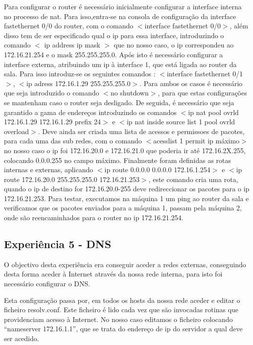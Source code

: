 \documentclass[a4paper]{article}
\begin{document}
Para configurar o router é necessário inicialmente configurar a interface interna no processo de nat. Para isso,entra-se na consola de configuração da interface fastethernet 0/0 do router, com o comando $<$interface fastethernet 0/0$>$, além disso tem de ser especificado qual o ip para essa interface, introduzindo o comando $<$ ip address ip mask $>$ que no nosso caso, o ip correspondeu ao 172.16.21.254 e o mask 255.255.255.0.  Após isto é necessário configurar a interface externa, atribuindo um ip à interface 1, que está ligada ao router da sala. Para isso introduz-se os seguintes comandos : $<$interface fastethernet 0/1$>$, $<$ip adress 172.16.1.29 255.255.255.0$>$. Para ambos os casos é necessário que seja introduzido o comando $<$no shutdown$>$, para que estas configurações se mantenham caso o router seja desligado. De seguida, é necessário que seja garantido a gama de endereços introduzindo os comandos $<$ip nat pool ovrld 172.16.1.29 172.16.1.29 prefix 24$>$ e $<$ip nat inside source list 1 pool ovrld overload$>$. Deve ainda ser criada uma lista de acessos e permissoes de pacotes, para cada uma das sub redes, com o comando $<$acesslist 1 permit ip máximo$>$ no nosso caso o ip foi 172.16.20.0 e 172.16.21.0 que poderia ir até 172.16.2X.255, colocando 0.0.0.255 no campo máximo.
Finalmente foram definidas as rotas internas e externas, aplicando $<$ip route 0.0.0.0
0.0.0.0 172.16.1.254$>$ e $<$ip route 172.16.20.0 255.255.255.0 172.16.21.253$>$, este comando cria uma rota, quando o ip de destino for 172.16.20.0-255 deve redireccionar os pacotes para o ip 172.16.21.253.
Para testar, executamos na máquina 1 um ping ao router da sala e verificamos que os pacotes enviados para a máquina 1, passam pela máquina 2, onde são reencaminhados para o router no ip 172.16.21.254.

\subsection{Experiência 5 - DNS}
O objectivo desta experiência era conseguir aceder a redes externas, conseguindo desta forma aceder à Internet através da nossa rede interna, para isto foi necessário configurar o DNS. 

Esta configuração passa por, em todos os hosts da nossa rede aceder e editar o ficheiro resolv.conf. Este ficheiro é lido cada vez que são invocadas rotinas que providenciam acesso à Internet. No nosso caso editamos o ficheiro colocando “nameserver 172.16.1.1”, que se trata do endereço de ip do servidor a qual deve ser acedido.	
\end{document}
